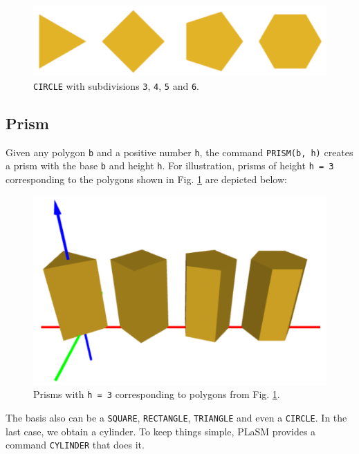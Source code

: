 \begin{figure}[!ht]
\begin{center}
\includegraphics[width=\textwidth]{img/ccc-111.png}
\end{center}
\vspace{-4mm}
\caption{{\tt CIRCLE} with subdivisions {\tt 3}, {\tt 4}, {\tt 5} and {\tt 6}.}
\label{fig:ccc-111}
\end{figure}
\noindent


\subsection{Prism}\label{subsec:prism}

Given any polygon {\tt b} and a positive number {\tt h}, the command 
{\tt PRISM(b, h)} creates a prism with the base {\tt b} and height {\tt h}. 
For illustration, prisms of height {\tt h = 3} corresponding to the 
polygons shown in Fig. \ref{fig:ccc-111} are depicted below:

\begin{figure}[!ht]
\begin{center}
\includegraphics[width=\textwidth]{img/prism-111.png}
\end{center}
\vspace{-4mm}
\caption{Prisms with {\tt h = 3} corresponding to polygons from Fig. \ref{fig:ccc-111}.}
\label{fig:prism-111}
\end{figure}
\noindent
The basis also can be a {\tt SQUARE}, {\tt RECTANGLE}, {\tt TRIANGLE}
and even a {\tt CIRCLE}. In the last case, we obtain a cylinder. 
To keep things simple, PLaSM provides a command {\tt CYLINDER} 
that does it.



